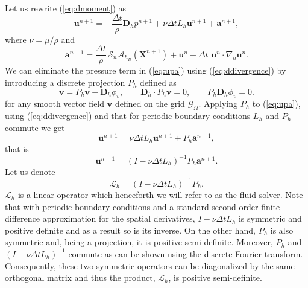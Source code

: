 \documentclass[preprint,12pt]{elsarticle}
\begin{document}
Let us rewrite (\ref{eq:dmoment}) as
\begin{equation}
\mathbf{u}^{n+1}=-\frac{\Delta t}{\rho} \mathbf{D}_h p^{n+1} + \nu\Delta t L_h \mathbf{u}^{n+1} + \mathbf{a}^{n+1},
\label{eq:upa}
\end{equation}
where $\nu=\mu/\rho$ and
\begin{equation}
\mathbf{a}^{n+1}= \frac{\Delta t}{\rho}\, \mathcal{S}_n\mathcal{A}_{h_B}(\mathbf{X}^{n+1})+\mathbf{u}^n-\Delta t \, \, \mathbf{u}^n \cdot \nabla_h \mathbf{u}^n. \label{eq:a}
\end{equation}
We can eliminate the pressure term in (\ref{eq:upa}) using (\ref{eq:ddivergence}) by introducing a discrete projection
$P_h$ defined as 
\begin{equation}
\mathbf{v} = P_h \mathbf{v} + \mathbf{D}_h \phi_v, \qquad \mathbf{D}_h \cdot P_h \mathbf{v} =0, \qquad P_h \mathbf{D}_h \phi_v=0.
\end{equation}
for any smooth vector field $\mathbf{v}$ defined on the grid $\mathcal{G}_{\Omega}$. Applying $P_h$ to (\ref{eq:upa}), using  (\ref{eq:ddivergence}) and that for periodic boundary conditions $L_h$ and $P_h$ commute we get
\begin{equation}
\mathbf{u}^{n+1}= \nu\Delta t L_h \mathbf{u}^{n+1} + P_h \mathbf{a}^{n+1},
\end{equation}
that is
\begin{equation}
\mathbf{u}^{n+1} = (I -\nu\Delta t L_h)^{-1}  P_h \mathbf{a}^{n+1}.
\end{equation}
Let us denote
\begin{equation}
\mathcal{L}_h = (I -\nu\Delta t L_h)^{-1}  P_h. \label{eq:L_h}
\end{equation}
$\mathcal{L}_h$ is a linear operator which henceforth we will refer to as the fluid solver. Note that with periodic boundary conditions and a standard second order finite difference approximation for the spatial derivatives,
  $I -\nu\Delta t L_h$ is symmetric and positive definite and as a result so is its inverse. 
  On the other hand, $P_h$ is also symmetric and, being 
  a projection, it is positive semi-definite. Moreover, $P_h$ and $(I -\nu\Delta t L_h)^{-1}$ commute 
  as can be shown using the discrete Fourier transform. Consequently, these two symmetric operators can be diagonalized by the same orthogonal matrix and thus the product, $\mathcal{L}_h $, is positive semi-definite. 
\end{document}
